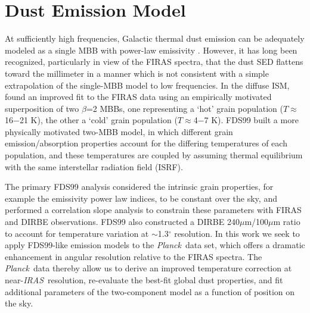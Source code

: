 \documentclass{emulateapj}
\newcommand{\IRAS}{{\it IRAS}}
\newcommand{\PLANCK}{{\it Planck}}
\begin{document}

\section{Dust Emission Model}
\label{sec:modeling}



At sufficiently high frequencies, Galactic thermal dust emission can be 
adequately modeled as a single MBB with power-law emissivity 
\citep[e.g. SFD;][]{planckdust}. However, it has long been recognized, 
particularly in view of the FIRAS spectra, that the dust SED flattens toward 
the millimeter in a manner which is not consistent with a simple extrapolation 
of the single-MBB model to low frequencies. In the diffuse ISM, \cite{reach95} 
found an improved fit to the FIRAS data using an empirically motivated 
superposition of two $\beta$=2 MBBs, one representing a `hot' grain population 
($T$$\approx$16$-$21 K), the other a `cold' grain population 
($T$$\approx$4$-$7 K). FDS99 built a more physically motivated two-MBB model, 
in which different grain emission/absorption properties account for the 
differing temperatures of each population, and these temperatures are coupled 
by assuming thermal equilibrium with the same interstellar radiation field 
(ISRF).

The primary FDS99 analysis considered the intrinsic grain properties, for 
example the emissivity power law indices, to be constant over the sky, and 
performed a correlation slope analysis to constrain these parameters with FIRAS
and DIRBE observations. FDS99 also constructed a DIRBE 240$\mu$m/100$\mu$m 
ratio to account for temperature variation at $\sim$1.3$^{\circ}$ resolution. 
In this work we seek to apply FDS99-like emission models to the \PLANCK~data 
set, which offers a dramatic enhancement in angular resolution relative to the 
FIRAS spectra. The \PLANCK~data thereby allow us to derive an improved 
temperature correction at near-\IRAS~resolution, re-evaluate the best-fit 
global dust properties, and fit additional parameters of the two-component 
model as a function of position on the sky.

\end{document}
